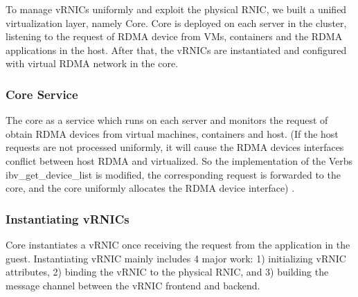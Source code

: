 
To manage vRNICs uniformly and exploit the physical RNIC, we built a unified virtualization layer, namely \sys Core. \sys Core is deployed on each server in the cluster, listening to the request of RDMA device from VMs, containers and the RDMA applications in the host. After that, the vRNICs are instantiated and configured with virtual RDMA network in the \sys core.


\subsubsection{\sys Core Service}


The \sys core as a service which runs on each server and monitors the request of obtain RDMA devices from virtual machines, containers and host. (If the host requests are not processed uniformly, it will cause the RDMA devices interfaces conflict between host RDMA and virtualized. So the implementation of the Verbs ibv\_get\_device\_list is modified, the corresponding request is forwarded to the \sys core, and the \sys core uniformly allocates the RDMA device interface) .

\subsubsection{Instantiating vRNICs}


\sys Core instantiates a vRNIC  once receiving the request from the application in the guest. Instantiating vRNIC mainly includes 4 major work: 1) initializing vRNIC attributes, 2) binding the vRNIC to the physical RNIC, and 3) building the message channel between the vRNIC frontend and backend.

